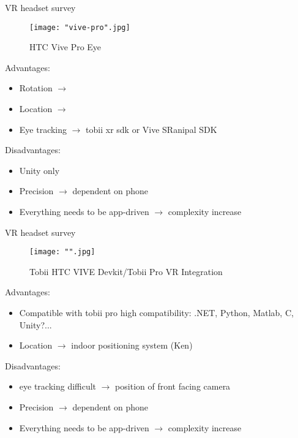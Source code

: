 \documentclass{beamer}
\begin{document}
\begin{frame}{VR headset survey}
	\begin{figure}
		\texttt{[image: "vive-pro".jpg]}
		\caption{HTC Vive Pro Eye}
	\end{figure}
	
	Advantages:
	\begin{itemize}
		\item Rotation $\rightarrow$
		\item Location $\rightarrow$ 
		\item Eye tracking $\rightarrow$ tobii xr sdk or Vive SRanipal SDK
	\end{itemize}
	
	Disadvantages:
	\begin{itemize}
		\item Unity only
		\item Precision $\rightarrow$ dependent on phone
		\item Everything needs to be app-driven $\rightarrow$ complexity increase
	\end{itemize}
\end{frame}



\begin{frame}{VR headset survey}
	\begin{figure}
		\texttt{[image: "".jpg]}
		\caption{Tobii HTC VIVE Devkit/Tobii Pro VR Integration}
	\end{figure}
	
	Advantages:
	\begin{itemize}
		\item Compatible with tobii pro \rightarrow high compatibility: .NET, Python, Matlab, C, Unity?...
		\item Location $\rightarrow$ indoor positioning system (Ken)
	\end{itemize}
	
	Disadvantages:
	\begin{itemize}
		\item eye tracking difficult $\rightarrow$ position of front facing camera
		\item Precision $\rightarrow$ dependent on phone
		\item Everything needs to be app-driven $\rightarrow$ complexity increase
	\end{itemize}
\end{frame}



\end{document}
